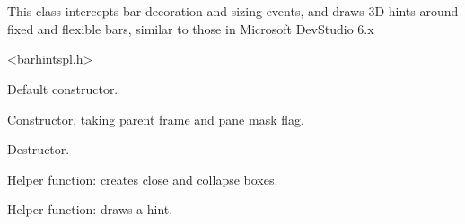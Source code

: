 %
%


\section{}\label{cbbarhintsplugin}


This class intercepts bar-decoration and sizing events, and draws 3D hints
around fixed and flexible bars, similar to those in Microsoft DevStudio 6.x




<barhintspl.h>




\label{cbbarhintsplugincbbarhintsplugin}


Default constructor.



Constructor, taking parent frame and pane mask flag.


\label{cbbarhintsplugindtor}


Destructor.


\label{cbbarhintsplugincreateboxes}


Helper function: creates close and collapse boxes.


\label{cbbarhintsplugindodrawhint}


Helper function: draws a hint.


\label{cbbarhintsplugindraw3dbox}


